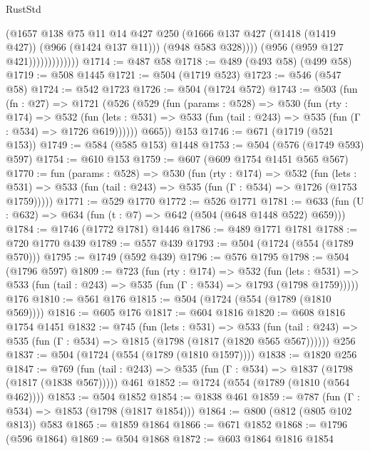 \begin{lexlean}{RustStd}
\begin{coremodule}
                              (@1657
                                @138
                                @75
                                @11
                                @14
                                @427
                                @250
                                (@1666 @137 @427 (@1418 (@1419 @427)) (@966 (@1424 @137 @11)))
                                (@948 @583 @328))))
                          (@956 (@959 @127 @421)))))))))))))
@1714 := @487 @58
@1718 := @489 (@493 @58) (@499 @58)
@1719 := @508 @1445
@1721 := @504 (@1719 @523)
@1723 := @546 (@547 @58)
@1724 := @542 @1723
@1726 := @504 (@1724 @572)
@1743 := @503
    (fun (fn : @27) =>
    @1721
      (@526
        (@529
          (fun (params : @528) =>
          @530
            (fun (rty : @174) =>
            @532
              (fun (lets : @531) =>
              @533 (fun (tail : @243) => @535 (fun (Γ : @534) => @1726 @619))))))
        @665))
    @153
@1746 := @671 (@1719 (@521 @153))
@1749 := @584 (@585 @153) @1448
@1753 := @504 (@576 (@1749 @593) @597)
@1754 := @610 @153
@1759 := @607 (@609 @1754 @1451 @565 @567)
@1770 := fun (params : @528) =>
  @530
    (fun (rty : @174) =>
    @532
      (fun (lets : @531) =>
      @533 (fun (tail : @243) => @535 (fun (Γ : @534) => @1726 (@1753 @1759)))))
@1771 := @529 @1770
@1772 := @526 @1771
@1781 := @633 (fun (U : @632) => @634 (fun (t : @7) => @642 (@504 (@648 @1448 @522) @659)))
@1784 := @1746 (@1772 @1781) @1446
@1786 := @489 @1771 @1781
@1788 := @720 @1770 @439
@1789 := @557 @439
@1793 := @504 (@1724 (@554 (@1789 @570)))
@1795 := @1749 (@592 @439)
@1796 := @576 @1795
@1798 := @504 (@1796 @597)
@1809 := @723
    (fun (rty : @174) =>
    @532
      (fun (lets : @531) =>
      @533 (fun (tail : @243) => @535 (fun (Γ : @534) => @1793 (@1798 @1759)))))
    @176
@1810 := @561 @176
@1815 := @504 (@1724 (@554 (@1789 (@1810 @569))))
@1816 := @605 @176
@1817 := @604 @1816
@1820 := @608 @1816 @1754 @1451
@1832 := @745
    (fun (lets : @531) =>
    @533 (fun (tail : @243) => @535 (fun (Γ : @534) => @1815 (@1798 (@1817 (@1820 @565 @567))))))
    @256
@1837 := @504 (@1724 (@554 (@1789 (@1810 @1597))))
@1838 := @1820 @256
@1847 := @769
    (fun (tail : @243) => @535 (fun (Γ : @534) => @1837 (@1798 (@1817 (@1838 @567)))))
    @461
@1852 := @1724 (@554 (@1789 (@1810 (@564 @462))))
@1853 := @504 @1852
@1854 := @1838 @461
@1859 := @787 (fun (Γ : @534) => @1853 (@1798 (@1817 @1854)))
@1864 := @800 (@812 (@805 @102 @813)) @583
@1865 := @1859 @1864
@1866 := @671 @1852
@1868 := @1796 (@596 @1864)
@1869 := @504 @1868
@1872 := @603 @1864 @1816 @1854

\end{coremodule}
\end{lexlean}
